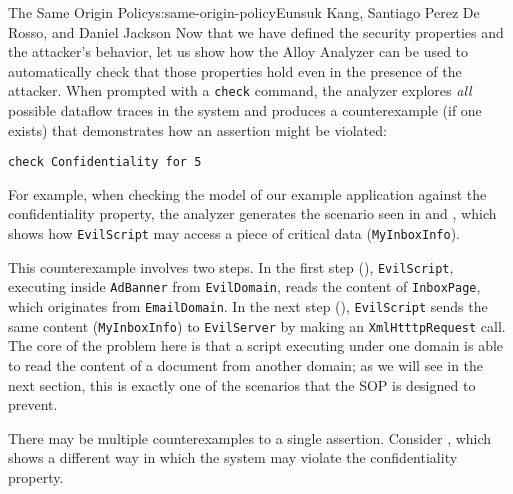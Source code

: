 \begin{aosachapter}{The Same Origin Policy}{s:same-origin-policy}{Eunsuk Kang, Santiago Perez De Rosso, and Daniel Jackson}
Now that we have defined the security properties and the attacker's
behavior, let us show how the Alloy Analyzer can be used to
automatically check that those properties hold even in the presence of
the attacker. When prompted with a \texttt{check} command, the analyzer
explores \emph{all} possible dataflow traces in the system and produces
a counterexample (if one exists) that demonstrates how an assertion
might be violated:

\begin{verbatim}
check Confidentiality for 5
\end{verbatim}

For example, when checking the model of our example application against
the confidentiality property, the analyzer generates the scenario seen
in  and
, which shows how
\texttt{EvilScript} may access a piece of critical data
(\texttt{MyInboxInfo}).


This counterexample involves two steps. In the first step
(),
\texttt{EvilScript}, executing inside \texttt{AdBanner} from
\texttt{EvilDomain}, reads the content of \texttt{InboxPage}, which
originates from \texttt{EmailDomain}. In the next step
(),
\texttt{EvilScript} sends the same content (\texttt{MyInboxInfo}) to
\texttt{EvilServer} by making an \texttt{XmlHtttpRequest} call. The core
of the problem here is that a script executing under one domain is able
to read the content of a document from another domain; as we will see in
the next section, this is exactly one of the scenarios that the SOP is
designed to prevent.

There may be multiple counterexamples to a single assertion. Consider
, which shows a
different way in which the system may violate the confidentiality
property.



\end{aosachapter}

